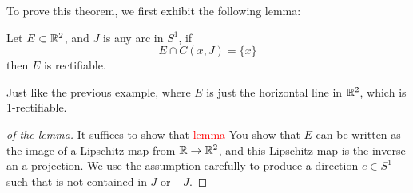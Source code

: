 To prove this theorem, we first exhibit the following lemma:
\begin{lemma}
    Let $E\subset\mathbb{R}^2$, and $J$ is any arc in $S^1$, if 
    \begin{equation*}
        E\cap C(x,J)=\{x\}
    \end{equation*}
    then $E$ is rectifiable.
\end{lemma}
\begin{example}
    Just like the previous example, where $E$ is just the horizontal line in $\mathbb{R}^2$, which is 1-rectifiable.
\end{example}
\begin{proof}[of the lemma] 
    It suffices to show that  \textcolor{red}{lemma}
    You show that $E$ can be written as the image of a Lipschitz map from $\mathbb{R}\to \mathbb{R}^2$, and this Lipschitz map is the inverse an a projection. We use the assumption carefully to produce a direction $e\in S^1$ such that is not contained in $J$ or $-J$. 
\end{proof}


